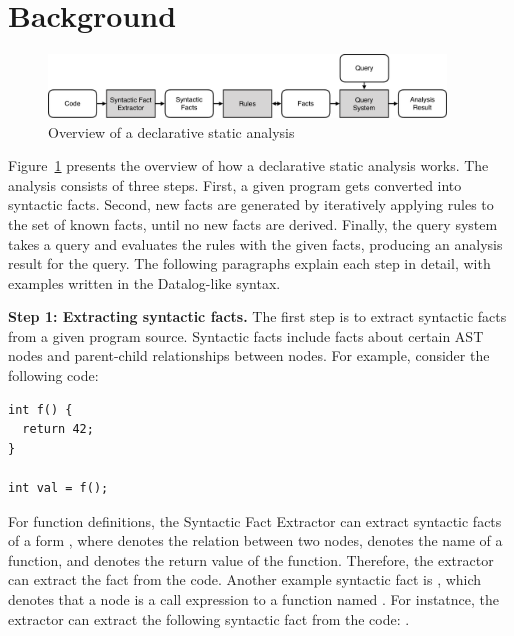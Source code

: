 \section{Background}\label{sec:background} 
\begin{figure}[t]
  \centering
  \vspace{2mm}
  \includegraphics[width=0.94\textwidth]{img/ov1.pdf}
  \caption{Overview of a declarative static analysis}
  \label{fig:ov1}
\end{figure}

Figure~\ref{fig:ov1} presents the overview of how a declarative static
analysis works.  The analysis consists of three steps.  First, a given program
gets converted into syntactic facts. 
Second, new facts are generated by iteratively applying rules to the set of
known facts, until no new facts are derived.  
Finally, the query system takes a query and evaluates the rules with the given
facts, producing an analysis result for the query. 
The following paragraphs explain each step in detail, with examples written in
the Datalog-like syntax.


\textbf{Step 1: Extracting syntactic facts.}
The first step is to extract syntactic facts from a given program source.
Syntactic facts include facts about certain AST nodes and
parent-child relationships between nodes. 
For example, consider the following code:

\begin{lstlisting}[style=mcpp]
int f() {
  return 42;
}

int val = f();
\end{lstlisting}

For function definitions, the Syntactic Fact Extractor can extract syntactic
facts of a form , where 
denotes the relation between two nodes,  denotes the name of a
function, and  denotes the return value of the function.
Therefore, the extractor can extract the fact  from
the code.  
Another example syntactic fact is , which
denotes that a node  is a call expression to a function named
.
For instatnce, the extractor can extract the following syntactic fact from the
code: .

